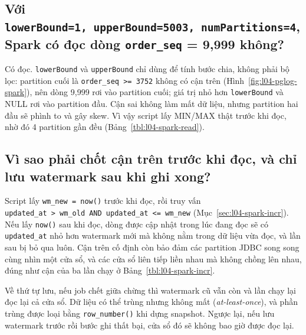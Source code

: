 \documentclass[
  12pt,
  a4paper,
]{report}
\begin{document}
\subsection{\texorpdfstring{Với
\texttt{lowerBound=}\allowbreak{}\texttt{1,}\allowbreak{}\texttt{\ upperBound=}\allowbreak{}\texttt{5003,}\allowbreak{}\texttt{\ numPartitions=}\allowbreak{}\texttt{4}\allowbreak{},
Spark có đọc dòng \texttt{order\_seq} = 9,999
không?}{Với lowerBound=1, upperBound=5003, numPartitions=4, Spark có đọc dòng order\_seq = 9,999 không?}}\label{sec:l04-q3}

Có đọc. \texttt{lowerBound} và \texttt{upperBound} chỉ dùng để tính bước
chia, không phải bộ lọc: partition cuối là
\texttt{order\_}\allowbreak{}\texttt{seq\ \textgreater{}=}\allowbreak{}\texttt{\ 3752}\allowbreak{}
không có cận trên (Hình~\ref{fig:l04-pglog-spark}), nên dòng 9,999 rơi
vào partition cuối; giá trị nhỏ hơn \texttt{lowerBound} và NULL rơi vào
partition đầu. Cận sai không làm mất dữ liệu, nhưng partition hai đầu sẽ
phình to và gây skew. Vì vậy script lấy MIN/MAX thật trước khi đọc, nhờ
đó 4 partition gần đều (Bảng~\ref{tbl:l04-spark-read}).

\subsection{Vì sao phải chốt cận trên trước khi đọc, và chỉ lưu
watermark sau khi ghi xong?}\label{sec:l04-q4}

Script lấy \texttt{wm\_new\ =\ now()} trước khi đọc, rồi truy vấn
\texttt{updated\_}\allowbreak{}\texttt{at\ \textgreater{}\ wm\_}\allowbreak{}\texttt{old\ AND\ updated\_}\allowbreak{}\texttt{at\ \textless{}=}\allowbreak{}\texttt{\ wm\_}\allowbreak{}\texttt{new}\allowbreak{}
(Mục~\ref{sec:l04-spark-incr}). Nếu lấy \texttt{now()} sau khi đọc, dòng
được cập nhật trong lúc đang đọc sẽ có \texttt{updated\_at} nhỏ hơn
watermark mới mà không nằm trong dữ liệu vừa đọc, và lần sau bị bỏ qua
luôn. Cận trên cố định còn bảo đảm các partition JDBC song song cùng
nhìn một cửa sổ, và các cửa sổ liên tiếp liền nhau mà không chồng lên
nhau, đúng như cận của ba lần chạy ở Bảng~\ref{tbl:l04-spark-incr}.

Về thứ tự lưu, nếu job chết giữa chừng thì watermark cũ vẫn còn và lần
chạy lại đọc lại cả cửa sổ. Dữ liệu có thể trùng nhưng không mất
(\emph{at-least-once}), và phần trùng được loại bằng
\texttt{row\_number()} khi dựng snapshot. Ngược lại, nếu lưu watermark
trước rồi bước ghi thất bại, cửa sổ đó sẽ không bao giờ được đọc lại.
\end{document}
